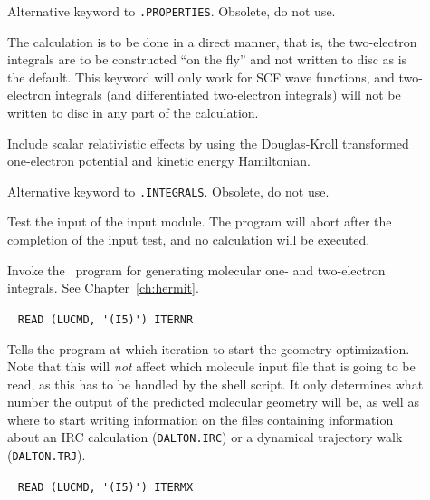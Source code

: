 \begin{description}
\item[] Alternative keyword to \verb|.PROPERTIES|. Obsolete, do not use.

\item[] The calculation is to be done in a direct
manner, that
is, the two-electron integrals are to be
constructed ``on the fly''
and not written to disc as is the default. This keyword will only work
for SCF wave functions, and
two-electron integrals (and differentiated
two-electron integrals) will not be written to disc in any part of the
calculation.

\item[] Include scalar relativistic effects by using the
Douglas-Kroll transformed one-electron potential and kinetic energy Hamiltonian.

\item[] Alternative keyword to \verb|.INTEGRALS|. Obsolete, do not use.

\item[] Test the input of the  input
module. The program will abort after the completion of the input test,
and no calculation will be executed.

\item[] Invoke the \her\ program for generating molecular one-
and two-electron integrals. See
Chapter~\ref{ch:hermit}.

\item[]\verb| |\newline
\verb|READ (LUCMD, '(I5)') ITERNR|

Tells the program at which iteration to start the geometry
optimization. Note that this will {\em not}
affect which molecule
input file that is going to be read, as this has to be handled by the
shell script. It only determines what number the
output of the predicted molecular geometry will be, as well as where to start 
writing information on the files containing information about an IRC 
calculation (\verb|DALTON.IRC|) or a dynamical trajectory walk (\verb|DALTON.TRJ|).

\item[]\verb| |\newline
\verb|READ (LUCMD, '(I5)') ITERMX|


\end{description}
